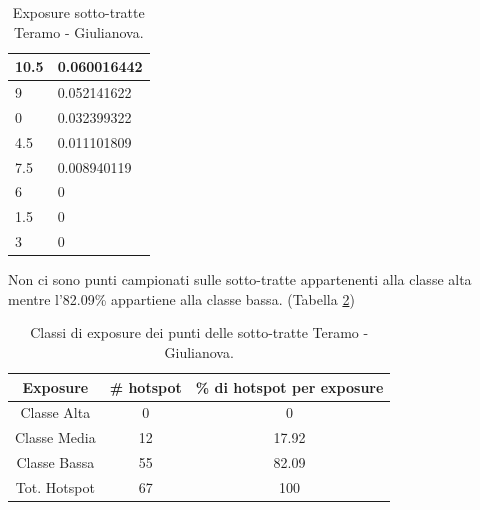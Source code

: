 \begin{table}[H]
\begin{tabular}{|l|l|}
		\rowcolor[HTML]{32CB00} 
		10.5                                                      & 0.060016442                                                    \\ \hline
		\rowcolor[HTML]{32CB00} 
		9                                                         & 0.052141622                                                    \\ \hline
		\rowcolor[HTML]{32CB00} 
		0                                                         & 0.032399322                                                    \\ \hline
		\rowcolor[HTML]{32CB00} 
		4.5                                                       & 0.011101809                                                    \\ \hline
		\rowcolor[HTML]{32CB00} 
		7.5                                                       & 0.008940119                                                    \\ \hline
		\rowcolor[HTML]{32CB00} 
		6                                                         & 0                                                              \\ \hline
		\rowcolor[HTML]{32CB00} 
		1.5                                                       & 0                                                              \\ \hline
		\rowcolor[HTML]{32CB00} 
		3                                                         & 0                                                              \\ \hline
	\end{tabular}
	\caption{Exposure sotto-tratte Teramo - Giulianova.}
	\label{exposure_teramo_giulianova}
\end{table}

Non ci sono punti campionati sulle sotto-tratte appartenenti alla classe alta mentre l'82.09\% appartiene alla classe bassa. (Tabella \ref{risultati_teramo_giulianova})

\begin{table}[H]
	\centering
	\begin{tabular}{|c|c|c|}
		\hline
		\rowcolor[HTML]{C0C0C0} 
		\textbf{Exposure} & \textbf{\# hotspot} & \textbf{\% di hotspot per exposure} \\ \hline
		Classe Alta       & 0                  & 0                                   \\ \hline
		Classe Media      & 12                 & 17.92                           \\ \hline
		Classe Bassa      & 55              & 82.09                               \\ \hline
		Tot. Hotspot      & 67               & 100                                 \\ \hline
	\end{tabular}
	\caption{Classi di exposure dei punti delle sotto-tratte Teramo - Giulianova.}
	\label{risultati_teramo_giulianova}
\end{table}


